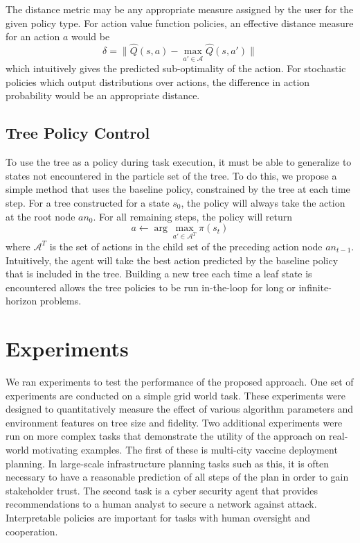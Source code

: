 \documentclass[letterpaper]{article} %
\begin{document}
The distance metric may be any appropriate measure assigned by the user for the given policy type.
For action value function policies, an effective distance measure for an action $a$ would be
\begin{equation}\label{eq: delta dqn}
    \delta = \| \hat{Q}(s, a) - \max_{a' \in \mathcal{A}} \hat{Q}(s, a') \|
\end{equation}
which intuitively gives the predicted sub-optimality of the action.
For stochastic policies which output distributions over actions, the difference in action probability would be an appropriate distance.

\subsection{Tree Policy Control}\label{sec: tree execution}
To use the tree as a policy during task execution, it must be able to generalize to states not encountered in the particle set of the tree.
To do this, we propose a simple method that uses the baseline policy, constrained by the tree at each time step.
For a tree constructed for a state $s_0$, the policy will always take the action at the root node $an_0$.
For all remaining steps, the policy will return
\begin{equation}
    a \gets \arg\max_{a' \in \mathcal{A}^T} \pi(s_t)
\end{equation}
where $\mathcal{A}^T$ is the set of actions in the child set of the preceding action node $an_{t-1}$.
Intuitively, the agent will take the best action predicted by the baseline policy that is included in the tree.
Building a new tree each time a leaf state is encountered allows the tree policies to be run in-the-loop for long or infinite-horizon problems.

\section{Experiments}
We ran experiments to test the performance of the proposed approach.
One set of experiments are conducted on a simple grid world task.
These experiments were designed to quantitatively measure the effect of various algorithm parameters and environment features on tree size and fidelity.
Two additional experiments were run on more complex tasks that demonstrate the utility of the approach on real-world motivating examples.
The first of these is multi-city vaccine deployment planning.
In large-scale infrastructure planning tasks such as this, it is often necessary to have a reasonable prediction of all steps of the plan in order to gain stakeholder trust.
The second task is a cyber security agent that provides recommendations to a human analyst to secure a network against attack.
Interpretable policies are important for tasks with human oversight and cooperation.
\end{document}
